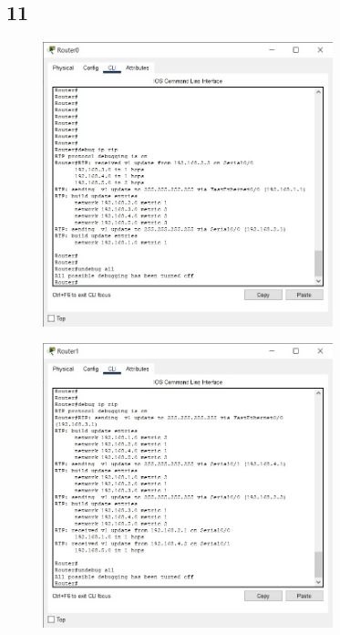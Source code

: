 \documentclass{article}
\begin{document}
\subsection{11}
\begin{figure}[H]
    \centering
    \includegraphics[width=0.75\textwidth]{figures/11.jpg}
    \caption{}
    \label{fig:fig1}
\end{figure}
\begin{figure}[H]
    \centering
    \includegraphics[width=0.75\textwidth]{figures/12.jpg}
    \caption{}
    \label{fig:fig1}
\end{figure}
\end{document}
